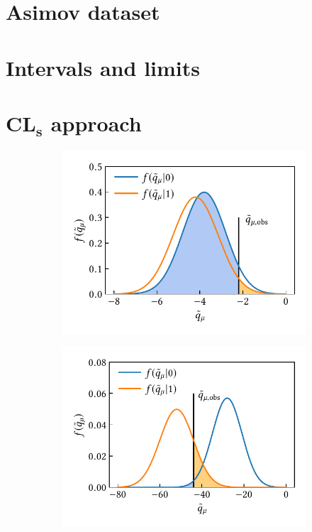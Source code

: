 \section{Asimov dataset}

\section{Intervals and limits}


\section[$CL_s$ approach]{$\boldsymbol{CL_s}$ approach}

\begin{figure}
	\centering
	\begin{subfigure}[b]{0.45\linewidth}
		\centering\includegraphics[width=\textwidth]{cls_1}
		\caption{\label{fig:cls_close}}
	\end{subfigure}%
	\begin{subfigure}[b]{0.45\linewidth}
		\centering\includegraphics[width=\textwidth]{cls_2}

\end{subfigure}
\end{figure}
